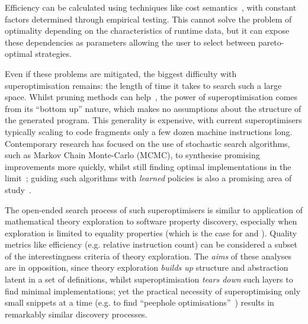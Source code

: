Efficiency can be calculated using techniques like cost
semantics~\cite{danner2015denotational}, with constant factors determined
through empirical testing. This cannot solve the problem of optimality depending
on the characteristics of runtime data, but it can expose these dependencies as
parameters allowing the user to select between pareto-optimal strategies.

Even if these problems are mitigated, the biggest difficulty with
superoptimisation remains: the length of time it takes to search such a
large space. Whilst pruning methods can help~\cite{phothilimthana2016scaling},
the power of superoptimisation comes from its ``bottom up'' nature, which makes
no assumptions about the structure of the generated program. This generality is
expensive, with current superoptimisers typically scaling to code fragments only
a few dozen machine instructions long. Contemporary research has focused on the
use of stochastic search algorithms, such as Markov Chain Monte-Carlo (MCMC), to
synthesise promising improvements more quickly, whilst still finding optimal
implementations in the limit~\cite{schkufza2013stochastic}; guiding such
algorithms with \emph{learned} policies is also a promising area of
study~\cite{mudigonda2017learning}.

The open-ended search process of such superoptimisers is similar to application
of mathematical theory exploration to software property discovery, especially
when exploration is limited to equality properties (which is the case for
\isacosy{} and \quickspec{}). Quality metrics like efficiency (e.g.
relative instruction count) can be considered a subset of the interestingness
criteria of theory exploration. The \emph{aims} of these analyses are in
opposition, since theory exploration \emph{builds up} structure and abstraction
latent in a set of definitions, whilst superoptimisation \emph{tears down} such
layers to find minimal implementations; yet the practical necessity of
superoptimising only small snippets at a time (e.g. to find ``peephole
optimisations''~\cite{Bansal.Aiken:2006}) results in remarkably similar
discovery processes.

